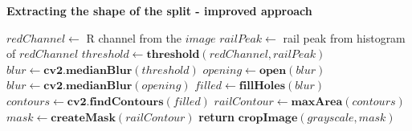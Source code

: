 \begin{algorithm}{\textbf{Extracting the shape of the split - improved approach}}
	\begin{spacing}{1.5}
	\begin{algorithmic}[1]
			\State $redChannel \gets$ R channel from the $image$
			\State $railPeak \gets$ rail peak from histogram of $redChannel$
			\State $threshold \gets \textbf{threshold}(redChannel, railPeak)$
			\State $blur \gets \textbf{cv2.medianBlur}(threshold)$
				\State $opening \gets \textbf{open}(blur)$
				\State $blur \gets \textbf{cv2.medianBlur}(opening)$
			\EndFor
			\State $filled \gets \textbf{fillHoles}(blur)$
			\State $contours \gets \textbf{cv2.findContours}(filled)$
			\State $railContour \gets \textbf{maxArea}(contours)$
			\State $mask \gets \textbf{createMask}(railContour)$
			\State \textbf{return} $\textbf{cropImage}(grayscale, mask)$
		\EndFunction
	\end{algorithmic}
	\end{spacing}
\end{algorithm}

